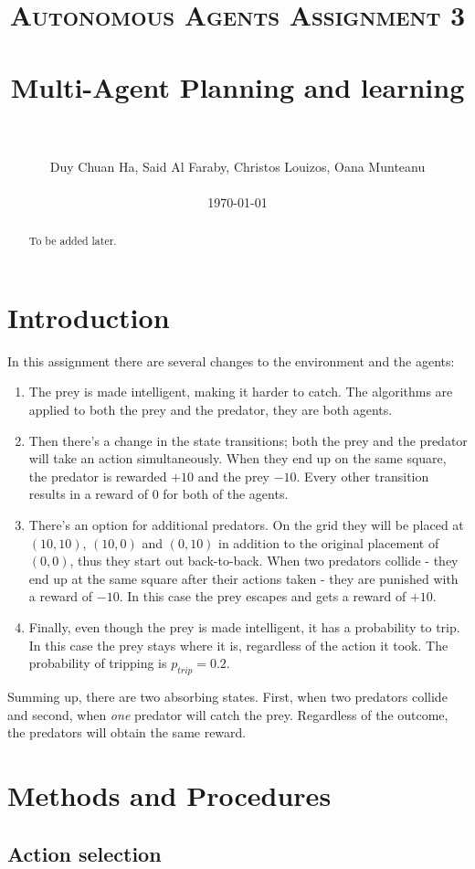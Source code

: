 \documentclass[paper=a4, fontsize=11pt]{scrartcl}
\title{
		\usefont{OT1}{bch}{b}{n}
		\normalfont \normalsize \textsc{Autonomous Agents Assignment 3} \\ [25pt]
		\horrule{0.5pt} \\[0.4cm]
		\huge Multi-Agent Planning and learning \\
		\horrule{2pt} \\[0.5cm]
}
\author{
        Duy Chuan Ha, Said Al Faraby, Christos Louizos, Oana Munteanu %
        \\
        \\
        \today
}
\date{}
\numberwithin{equation}{section}		%
\numberwithin{figure}{section}			%
\numberwithin{table}{section}				%
\begin{document}
\maketitle
\bigskip
\begin{abstract}
To be added later.\\
\end{abstract}

\section{Introduction}
In this assignment there are several changes to the environment and the agents: 
\begin{enumerate}
\item The prey is made intelligent, making it harder to catch. The algorithms are applied to both the prey and the predator, they are both agents.
\item Then there's a change in the state transitions; both the prey and the predator will take an action simultaneously. When they end up on the same square, the predator is rewarded $+10$ and the prey $-10$. Every other transition results in a reward of $0$ for both of the agents.
\item There's an option for additional predators. On the grid they will be placed at $(10,10)$, $(10,0)$ and $(0,10)$ in addition to the original placement of $(0,0)$, thus they start out back-to-back. When two predators collide - they end up at the same square after their actions taken - they are punished with a reward of $-10$. In this case the prey escapes and gets a reward of $+10$.
\item Finally, even though the prey is made intelligent, it has a probability to trip. In this case the prey stays where it is, regardless of the action it took. The probability of tripping is $p_{trip}=0.2$.
\end{enumerate}
Summing up, there are two absorbing states. First, when two predators collide and second, when \emph{one} predator will catch the prey. Regardless of the outcome, the predators will obtain the same reward.
\section{Methods and Procedures}
\label{methods}
\subsection{\textbf {Action selection}}
\end{document}
